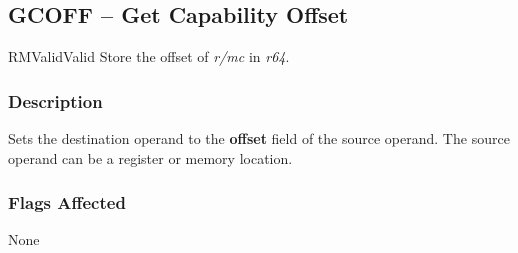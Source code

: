 \clearpage
{}
{}
\subsection*{GCOFF -- Get Capability Offset}

\begin{x86opcodetable}
  {RM}{Valid}{Valid}
  {Store the offset of \emph{r/mc} in \emph{r64}.}
\end{x86opcodetable}

\begin{x86opentable}
\end{x86opentable}

\subsubsection*{Description}

Sets the destination operand to the \textbf{offset} field of the
source operand.  The source operand can be a register or memory
location.

\subsubsection*{Flags Affected}

None
